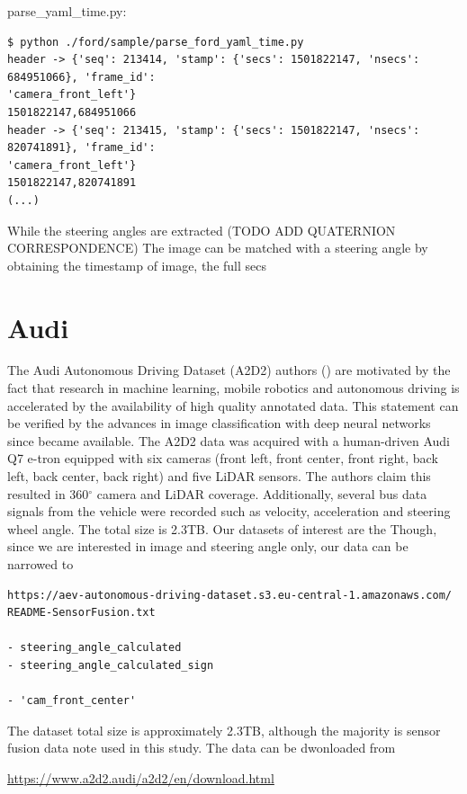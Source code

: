 parse\_yaml\_time.py:
\begin{verbatim}
$ python ./ford/sample/parse_ford_yaml_time.py
header -> {'seq': 213414, 'stamp': {'secs': 1501822147, 'nsecs': 684951066}, 'frame_id':
'camera_front_left'}
1501822147,684951066
header -> {'seq': 213415, 'stamp': {'secs': 1501822147, 'nsecs': 820741891}, 'frame_id':
'camera_front_left'}
1501822147,820741891
(...)
\end{verbatim}
While the steering angles are extracted (TODO ADD QUATERNION CORRESPONDENCE)
The image can be matched with a steering angle by obtaining the timestamp of image, the full secs 

\section{Audi}

The  Audi Autonomous Driving Dataset (A2D2)
authors (\cite{geyer2020a2d2}) are motivated by the fact that research in machine learning, mobile robotics and autonomous driving is accelerated by the availability of high quality annotated data. This statement can be verified by the advances in image classification with deep neural networks since \cite{IMAGENET} became available.  
The A2D2 data was acquired with a human-driven Audi Q7 e-tron equipped with six cameras (front left, front center, front right, back left, back center, back right) and five LiDAR sensors. The authors claim this resulted in  360$^{\circ}$ camera and LiDAR coverage. Additionally, several bus data signals from the vehicle were recorded such as velocity, acceleration and steering wheel angle. 
The total size is 2.3TB. Our datasets of interest are the  Though, since we are interested in image and steering angle only, our data can be narrowed to 
\begin{verbatim}
https://aev-autonomous-driving-dataset.s3.eu-central-1.amazonaws.com/
README-SensorFusion.txt
    
- steering_angle_calculated
- steering_angle_calculated_sign

- 'cam_front_center'
\end{verbatim}

The dataset total size is approximately 2.3TB, although the majority is sensor fusion data note used in this study. The data can be dwonloaded from   
  
\url{https://www.a2d2.audi/a2d2/en/download.html}

